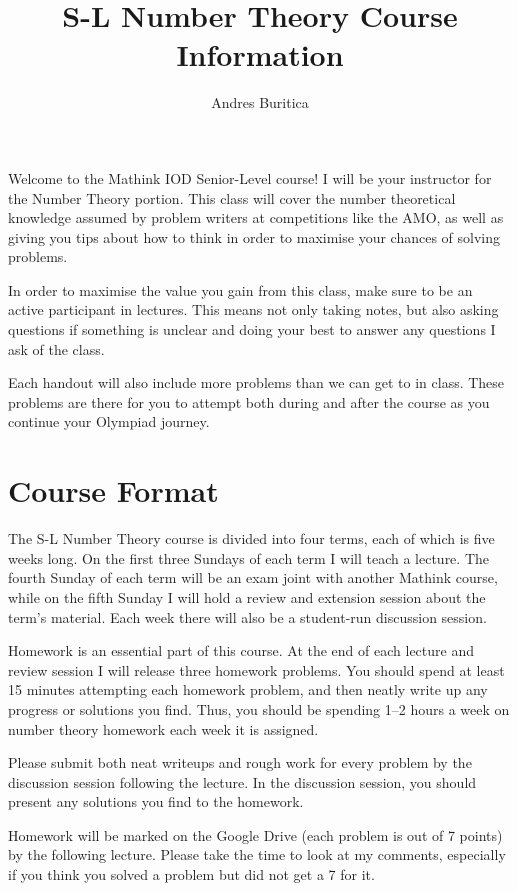 \documentclass{article}
\title{S-L Number Theory Course Information}
\author{Andres Buritica}
\date{}
\begin{document}
\maketitle
Welcome to the Mathink IOD Senior-Level course! I will be your instructor for the
Number Theory portion. This class will cover the number theoretical knowledge
assumed by problem writers at competitions like the AMO, as well as giving you
tips about how to think in order to maximise your chances of solving problems.

In order to maximise the value you gain from this class, make sure to be an
active participant in lectures. This means not only taking notes, but also
asking questions if something is unclear and doing your best to answer any
questions I ask of the class.

Each handout will also include more problems than we can get to in class. These
problems are there for you to attempt both during and after the course as you
continue your Olympiad journey.
\section{Course Format}
The S-L Number Theory course is divided into four terms, each of which is five
weeks long. On the first three Sundays of each term I will teach a lecture. The
fourth Sunday of each term will be an exam joint with another Mathink course,
while on the fifth Sunday I will hold a review and extension session about the
term's material. Each week there will also be a student-run discussion session.

Homework is an essential part of this course. At the end of each lecture and
review session I will release three homework problems. You should spend at
least 15 minutes attempting each homework problem, and then neatly write up any
progress or solutions you find. Thus, you should be spending 1--2 hours a week
on number theory homework each week it is assigned.

Please submit both neat writeups and rough work
for every problem by the discussion session following the lecture. In the
discussion session, you should present any solutions you find to the homework.

Homework will be marked on the Google Drive (each problem is out of 7 points)
by the following lecture. Please
take the time to look at my comments, especially if you think you solved a
problem but did not get a 7 for it.
\newpage
\end{document}
